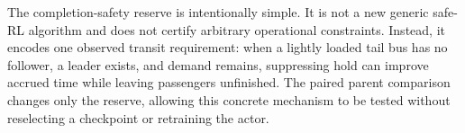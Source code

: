 The completion-safety reserve is intentionally simple. It is not a new generic
safe-RL algorithm and does not certify arbitrary operational constraints.
Instead, it encodes one observed transit requirement: when a lightly loaded
tail bus has no follower, a leader exists, and demand remains, suppressing hold
can improve accrued time while leaving passengers unfinished. The paired parent
comparison changes only the reserve, allowing this concrete mechanism to be
tested without reselecting a checkpoint or retraining the actor.

